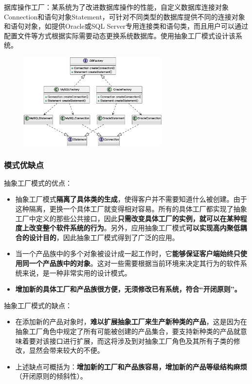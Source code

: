 据库操作工厂：某系统为了改进数据库操作的性能，自定义数据库连接对象Connection和语句对象Statement，可针对不同类型的数据库提供不同的连接对象和语句对象，如提供Oracle或SQL Server专用连接类和语句类，而且用户可以通过配置文件等方式根据实际需要动态更换系统数据库。使用抽象工厂模式设计该系统。
\begin{figure}[H]
    \vspace{-0.5em}
	\centering
	\includegraphics[width=0.67\textwidth]{images/抽象工厂模式实例2.eps}
    \vspace{-1em}
\end{figure}

\subsubsection{模式优缺点}
抽象工厂模式的优点：
\begin{itemize}
    \item 抽象工厂模式\textbf{隔离了具体类的生成}，使得客户并不需要知道什么被创建。由于这种隔离，更换一个具体工厂就变得相对容易。所有的具体工厂都实现了抽象工厂中定义的那些公共接口，因此\textbf{只需改变具体工厂的实例，就可以在某种程度上改变整个软件系统的行为}。另外，应用抽象工厂模式\textbf{可以实现高内聚低耦合的设计目的}，因此抽象工厂模式得到了广泛的应用。
    \item 当一个产品族中的多个对象被设计成一起工作时，它\textbf{能够保证客户端始终只使用同一个产品族中的对象}。这对一些需要根据当前环境来决定其行为的软件系统来说，是一种非常实用的设计模式。
    \item \textbf{增加新的具体工厂和产品族很方便，无须修改已有系统，符合“开闭原则”。}
\end{itemize}

抽象工厂模式的缺点：
\begin{itemize}
    \item 在添加新的产品对象时，\textbf{难以扩展抽象工厂来生产新种类的产品}，这是因为在抽象工厂角色中规定了所有可能被创建的产品集合，要支持新种类的产品就意味着要对该接口进行扩展，而这将涉及到对抽象工厂角色及其所有子类的修改，显然会带来较大的不便。
    \item 上述缺点可概括为：\textbf{增加新的工厂和产品族容易，增加新的产品等级结构麻烦}（开闭原则的倾斜性）。
\end{itemize}

